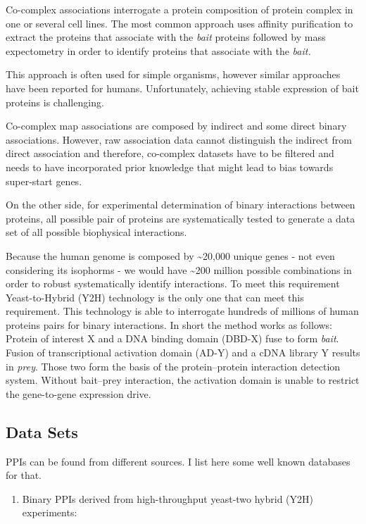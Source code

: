 \documentclass[
]{book}
\providecommand{\tightlist}{%
  \setlength{\itemsep}{0pt}\setlength{\parskip}{0pt}}
\begin{document}
Co-complex associations interrogate a protein composition of protein complex in one or several cell lines. The most common approach uses affinity purification to extract the proteins that associate with the \emph{bait} proteins followed by mass expectometry in order to identify proteins that associate with the \emph{bait.}

This approach is often used for simple organisms, however similar approaches have been reported for humans. Unfortunately, achieving stable expression of bait proteins is challenging.

Co-complex map associations are composed by indirect and some direct binary associations. However, raw association data cannot distinguish the indirect from direct association and therefore, co-complex datasets have to be filtered and needs to have incorporated prior knowledge that might lead to bias towards super-start genes.

On the other side, for experimental determination of binary interactions between proteins, all possible pair of proteins are systematically tested to generate a data set of all possible biophysical interactions.

Because the human genome is composed by \textasciitilde20,000 unique genes - not even considering its isophorms - we would have \textasciitilde200 million possible combinations in order to robust systematically identify interactions. To meet this requirement Yeast-to-Hybrid (Y2H) technology is the only one that can meet this requirement. This technology is able to interrogate hundreds of millions of human proteins pairs for binary interactions. In short the method works as follows: Protein of interest X and a DNA binding domain (DBD-X) fuse to form \emph{bait}. Fusion of transcriptional activation domain (AD-Y) and a cDNA library Y results in \emph{prey}. Those two form the basis of the protein--protein interaction detection system. Without bait--prey interaction, the activation domain is unable to restrict the gene-to-gene expression drive.

\hypertarget{data-sets}{%
\subsection{Data Sets}\label{data-sets}}

PPIs can be found from different sources. I list here some well known databases for that.

\begin{enumerate}
\def\labelenumi{\arabic{enumi}.}
\tightlist
\item
  Binary PPIs derived from high-throughput yeast-two hybrid (Y2H) experiments:
\end{enumerate}
\end{document}
